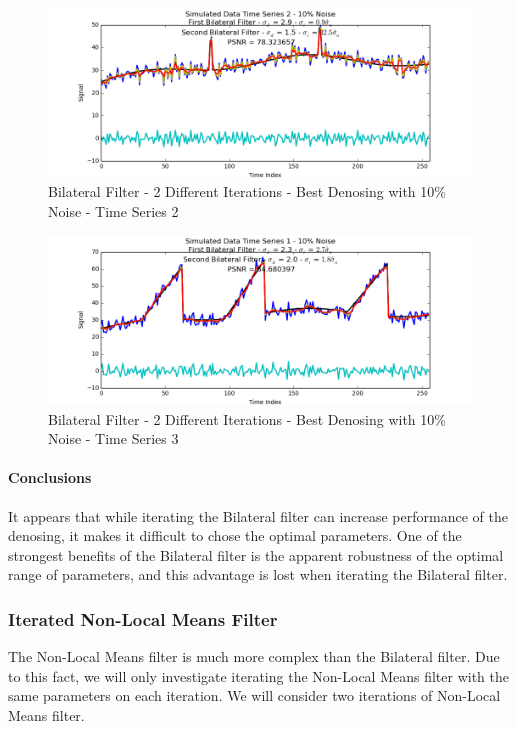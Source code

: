 \documentclass[11pt]{article}
\theoremstyle{definition}
\begin{document}
\begin{figure}
\centering
\includegraphics[width = 0.75 \textwidth]{2DiffBilateralSignal2Best.png}
\caption{Bilateral Filter - 2 Different Iterations - Best Denosing with 10\% Noise - Time Series 2}
\label{2diffbilateral2best}
\end{figure}

\begin{figure}
\centering
\includegraphics[width = 0.75 \textwidth]{2DiffBilateralSignal3Best.png}
\caption{Bilateral Filter - 2 Different Iterations - Best Denosing with 10\% Noise - Time Series 3}
\label{2diffbilateral3best}
\end{figure}

\newpage

\paragraph{Conclusions}

It appears that while iterating the Bilateral filter can increase performance of the denosing, it makes it difficult to chose the optimal parameters. One of the strongest benefits of the Bilateral filter is the apparent robustness of the optimal range of parameters, and this advantage is lost when iterating the Bilateral filter.

\subsubsection{Iterated Non-Local Means Filter}

The Non-Local Means filter is much more complex than the Bilateral filter. Due to this fact, we will only investigate iterating the Non-Local Means filter with the same parameters on each iteration. We will consider two iterations of Non-Local Means filter.\\
\end{document}
